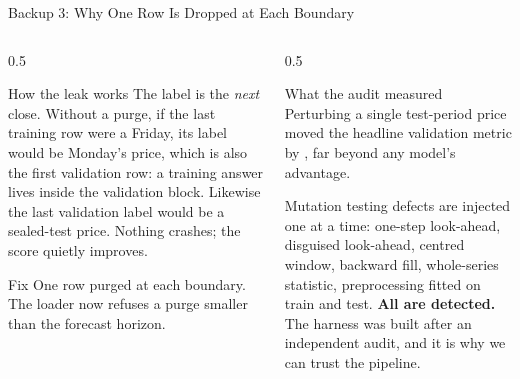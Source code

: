 \documentclass[aspectratio=169,11pt]{beamer}
\begin{document}
\begin{frame}{Backup 3: Why One Row Is Dropped at Each Boundary}
  \begin{columns}[T]
    \begin{column}{0.5\textwidth}
      \begin{block}{How the leak works}
        \scriptsize
        The label is the \emph{next} close. Without a purge, if the last training
        row were a Friday, its label would be Monday's price, which is also the
        first validation row: a training answer lives inside the validation
        block. Likewise the last validation label would be a sealed-test price.
        Nothing crashes; the score quietly improves.
      \end{block}
      \begin{block}{Fix}
        \scriptsize
        One row purged at each boundary. The loader now refuses a purge
        smaller than the forecast horizon.
      \end{block}
    \end{column}
    \begin{column}{0.5\textwidth}
      \begin{block}{What the audit measured}
        \scriptsize
        Perturbing a single test-period price moved the headline validation
        metric by \textbf{\LeakDelta{}}, far beyond any model's advantage.
      \end{block}
      \begin{block}{Mutation testing}
        \scriptsize
        \NMutations{} defects are injected one at a time: one-step look-ahead,
        disguised look-ahead, centred window, backward fill, whole-series
        statistic, preprocessing fitted on train and test.
        \textbf{All \NMutations{} are detected.} The harness was built after
        an independent audit, and it is why we can trust the pipeline.
      \end{block}
    \end{column}
  \end{columns}
\end{frame}
\end{document}
